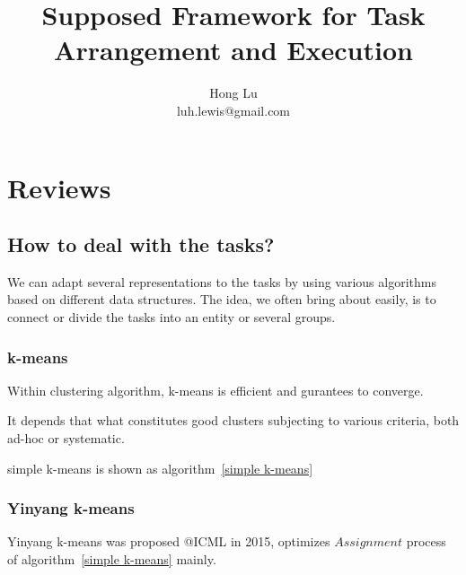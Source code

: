 \documentclass[12pt, a4paper]{article}
\author{Hong Lu \\ luh.lewis@gmail.com}
\date{}
\begin{document}
    \title{Supposed Framework for Task Arrangement and Execution}
    \maketitle

    \section{Reviews}
    \subsection*{How to deal with the tasks?}
    We can adapt several representations to the tasks by using various algorithms based on different data structures.
    The idea, we often bring about easily, is to connect or divide the tasks into an entity or several groups.
    \subsubsection*{k-means}
    Within clustering algorithm, k-means is efficient and gurantees to converge. 
    
    It depends that what constitutes good clusters subjecting to various criteria, both ad-hoc or systematic.  
    
    simple k-means is shown as algorithm~\ref{simple k-means}
    
    \subsubsection*{Yinyang k-means}
    Yinyang k-means was proposed @ICML in 2015, optimizes $Assignment$ process of algorithm~\ref{simple k-means} mainly.
\end{document}
